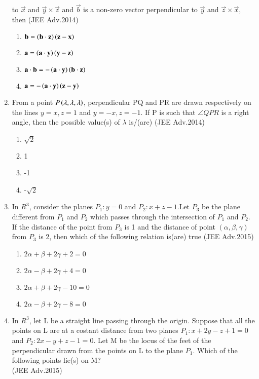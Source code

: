 \documentclass[journal]{IEEEtran}
\numberwithin{equation}{enumi}
\numberwithin{figure}{enumi}
\begin{document}
\begin{enumerate}
		to $\vec{x}$ and $\vec{y}\times \vec{z}$ and $\vec{b}$ is a non-zero vector perpendicular to $\vec{y}$ and $\vec{z}\times \vec{x}$, then \hfill{(JEE Adv.2014)}
		\begin{enumerate}
			\item $\mathbf{b}=\left(\mathbf{b} \cdot \mathbf{z}\right)\left(\mathbf{z}-\mathbf{x}\right)$
			\item $\mathbf{a}=\left(\mathbf{a} \cdot \mathbf{y}\right)\left(\mathbf{y}-\mathbf{z}\right)$
			\item $\mathbf{a}\cdot\mathbf{b}=-\left(\mathbf{a} \cdot \mathbf{y}\right)\left(\mathbf{b}\cdot\mathbf{z}\right)$
			\item $\mathbf{a}=-\left(\mathbf{a} \cdot \mathbf{y}\right)\left(\mathbf{z}-\mathbf{y}\right)$
		\end{enumerate}
	\item From a point $P\left(\lambda,\lambda,\lambda\right)$, perpendicular PQ and PR are drawn respectively on the lines $y=x,z=1$ and $y=-x,z=-1$. If P is such that $\angle QPR$ is a right angle, then
		the possible value(s) of $\lambda$ is/(are) \hfill{(JEE Adv.2014)}
		\begin{enumerate}
			\item $\sqrt{2}$
			\item 1 
			\item -1 
			\item -$\sqrt{2}$
		\end{enumerate}
	\item In $R^3$, consider the planes $P_1:y=0$ and $P_2:x+z-1$.Let $P_3$ be the plane different from $P_1$ and $P_2$ which passes through the intersection of $P_1$ and $P_2$. If the distance of the
		point from $P_3$ is 1 and the distance of point $(\alpha,\beta,\gamma)$ from $P_3$ is 2,  then which of the following relation is(are) true \hfill{(JEE Adv.2015)}
		\begin{enumerate}
			\item $2\alpha+\beta+2\gamma+2=0$
			\item $2\alpha-\beta+2\gamma+4=0$
			\item $2\alpha+\beta+2\gamma-10=0$
			\item $2\alpha-\beta+2\gamma-8=0$
		\end{enumerate}
	\item In $R^3$, let L be a straight line passing through the origin. Suppose that all the points on L are at a costant distance from two planes $P_1:x+2y-z+1=0$ and $P_2:2x-y+z-1=0$. Let M be the
		locus of the feet of the perpendicular drawn from the points on L to the plane $P_1$. Which of the following points lie(s) on M? \\ \hfill{(JEE Adv.2015)}

\end{enumerate}
\end{document}
